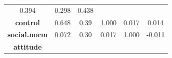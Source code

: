 \documentclass[]{article}
\theoremstyle{definition}
\theoremstyle{definition}
\theoremstyle{definition}
\theoremstyle{remark}
\begin{document}
\begin{longtable}[]{@{}cccccc@{}}
\begin{minipage}[t]{0.11\columnwidth}
0.394\strut
\end{minipage} & \begin{minipage}[t]{0.15\columnwidth}\centering\strut
0.298\strut
\end{minipage} & \begin{minipage}[t]{0.11\columnwidth}\centering\strut
0.438\strut
\end{minipage}\tabularnewline
\begin{minipage}[t]{0.20\columnwidth}\centering\strut
\textbf{control}\strut
\end{minipage} & \begin{minipage}[t]{0.13\columnwidth}\centering\strut
0.648\strut
\end{minipage} & \begin{minipage}[t]{0.13\columnwidth}\centering\strut
0.39\strut
\end{minipage} & \begin{minipage}[t]{0.11\columnwidth}\centering\strut
1.000\strut
\end{minipage} & \begin{minipage}[t]{0.15\columnwidth}\centering\strut
0.017\strut
\end{minipage} & \begin{minipage}[t]{0.11\columnwidth}\centering\strut
0.014\strut
\end{minipage}\tabularnewline
\begin{minipage}[t]{0.20\columnwidth}\centering\strut
\textbf{social.norm}\strut
\end{minipage} & \begin{minipage}[t]{0.13\columnwidth}\centering\strut
0.072\strut
\end{minipage} & \begin{minipage}[t]{0.13\columnwidth}\centering\strut
0.30\strut
\end{minipage} & \begin{minipage}[t]{0.11\columnwidth}\centering\strut
0.017\strut
\end{minipage} & \begin{minipage}[t]{0.15\columnwidth}\centering\strut
1.000\strut
\end{minipage} & \begin{minipage}[t]{0.11\columnwidth}\centering\strut
-0.011\strut
\end{minipage}\tabularnewline
\begin{minipage}[t]{0.20\columnwidth}\centering\strut
\textbf{attitude}\strut
\end{minipage} & \begin{minipage}[t]{0.13\columnwidth}\centering\strut

\end{minipage}
\end{longtable}
\end{document}
